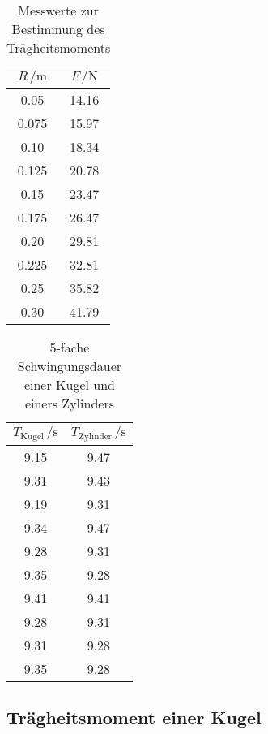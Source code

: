 \begin{table}[H]
  \centering
  \caption{Messwerte zur Bestimmung des Trägheitsmoments}
  \label{tab:Traegheitsmoment}
  \begin{tabular}{
  c c
  }
    \toprule
     $R \, / \unit{\meter}$ & $F\, / \unit{\newton}$\\
    \midrule
    0.05  & 14.16 \\
    0.075 & 15.97 \\
    0.10  & 18.34 \\
    0.125 & 20.78 \\
    0.15  & 23.47 \\
    0.175 & 26.47 \\
    0.20  & 29.81 \\
    0.225 & 32.81 \\
    0.25  & 35.82 \\
    0.30  & 41.79 \\
    \bottomrule
  \end{tabular}
\end{table}


\begin{table}[H]
  \centering
  \caption{5-fache Schwingungsdauer einer Kugel und einers Zylinders}
  \label{tab:Kugel_Zylinder}
  \begin{tabular}{
  c c
  }
    \toprule
     $T_\text{Kugel}\, / \unit{\second}$ & $T_\text{Zylinder}\, / \unit{\second}$\\
    \midrule
    9.15 & 9.47 \\
    9.31 & 9.43 \\
    9.19 & 9.31 \\
    9.34 & 9.47 \\
    9.28 & 9.31 \\
    9.35 & 9.28 \\
    9.41 & 9.41 \\
    9.28 & 9.31 \\
    9.31 & 9.28 \\
    9.35 & 9.28 \\
    \bottomrule
  \end{tabular}
\end{table}
\subsection{Trägheitsmoment einer Kugel}


